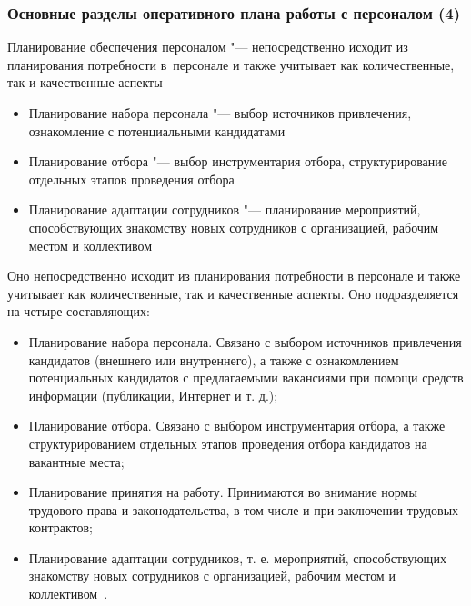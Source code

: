 \documentclass{../industrial-development}
\begin{document}
	\begin{frame} \frametitle{Основные разделы оперативного плана работы с персоналом (4)}
		\alert{Планирование обеспечения персоналом} "--- непосредственно исходит из планирования потребности в~персонале и также учитывает как количественные, так и качественные аспекты
		\begin{itemize}
			\item {\small Планирование набора персонала "--- выбор источников привлечения, ознакомление с потенциальными кандидатами}
			\item {\small Планирование отбора "--- выбор инструментария отбора, структурирование отдельных этапов проведения отбора}
			\item {\small Планирование адаптации сотрудников "--- планирование мероприятий, способствующих знакомству новых сотрудников с организацией, рабочим местом и коллективом}
		\end{itemize}
	\end{frame}
	
	\lecturenotes
	
	Оно непосредственно исходит из планирования потребности в персонале и также учитывает как количественные, так и качественные аспекты. Оно подразделяется на четыре составляющих:
	\begin{itemize}
		\item Планирование набора персонала. Связано с выбором источников привлечения кандидатов (внешнего или внутреннего), а также с ознакомлением потенциальных кандидатов с предлагаемыми вакансиями при помощи средств информации (публикации, Интернет и т. д.);
		\item Планирование отбора. Связано с выбором инструментария отбора, а также структурированием отдельных этапов проведения отбора кандидатов на вакантные места;
		\item Планирование принятия на работу. Принимаются во внимание нормы трудового права и законодательства, в том числе и при заключении трудовых контрактов;
		\item Планирование адаптации сотрудников, т. е. мероприятий, способствующих знакомству новых сотрудников с организацией, рабочим местом и коллективом~\cite{Durakova}.
	\end{itemize}
	
\end{document}
